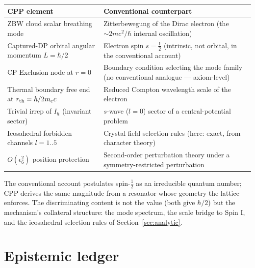 \documentclass[12pt]{article}
\begin{document}
\begin{center}
\begin{tabular}{p{}|p{}}
\textbf{CPP element} & \textbf{Conventional counterpart} \\
\hline
ZBW cloud scalar breathing mode & Zitterbewegung of the Dirac electron
(the $\sim 2mc^2/\hbar$ internal oscillation) \\
Captured-DP orbital angular momentum $L = \hbar/2$ & Electron spin
$s = \tfrac12$ (intrinsic, not orbital, in the conventional account) \\
CP Exclusion node at $r = 0$ & Boundary condition selecting the mode
family (no conventional analogue --- axiom-level) \\
Thermal boundary free end at $r_{\rm th} = \hbar/2m_ec$ & Reduced
Compton wavelength scale of the electron \\
Trivial irrep of $I_h$ (invariant sector) & $s$-wave ($l = 0$) sector of
a central-potential problem \\
Icosahedral forbidden channels $l = 1..5$ & Crystal-field selection
rules (here: exact, from character theory) \\
$O(\epsilon_6^2)$ position protection & Second-order perturbation
theory under a symmetry-restricted perturbation \\
\end{tabular}
\end{center}

The conventional account postulates spin-$\tfrac12$ as an irreducible
quantum number; CPP derives the same magnitude from a resonator whose
geometry the lattice enforces.  The discriminating content is not the
value (both give $\hbar/2$) but the mechanism's collateral structure:
the mode spectrum, the scale bridge to Spin I, and the icosahedral
selection rules of Section~\ref{sec:analytic}.

\section{Epistemic ledger}
\label{sec:ledger}
\end{document}
